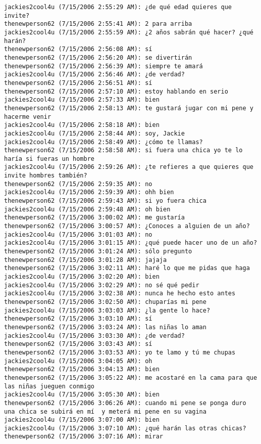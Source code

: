 \begin{verbatim}
jackies2cool4u (7/15/2006 2:55:29 AM): ¿de qué edad quieres que invite?
thenewperson62 (7/15/2006 2:55:41 AM): 2 para arriba
jackies2cool4u (7/15/2006 2:55:59 AM): ¿2 años sabrán qué hacer? ¿qué harán?
thenewperson62 (7/15/2006 2:56:08 AM): sí
thenewperson62 (7/15/2006 2:56:20 AM): se divertirán
thenewperson62 (7/15/2006 2:56:39 AM): siempre te amará
jackies2cool4u (7/15/2006 2:56:46 AM): ¿de verdad?
thenewperson62 (7/15/2006 2:56:51 AM): sí
thenewperson62 (7/15/2006 2:57:10 AM): estoy hablando en serio
jackies2cool4u (7/15/2006 2:57:33 AM): bien
thenewperson62 (7/15/2006 2:58:13 AM): te gustará jugar con mi pene y hacerme venir
jackies2cool4u (7/15/2006 2:58:18 AM): bien
jackies2cool4u (7/15/2006 2:58:44 AM): soy, Jackie
jackies2cool4u (7/15/2006 2:58:49 AM): ¿cómo te llamas?
thenewperson62 (7/15/2006 2:58:58 AM): si fuera una chica yo te lo haría si fueras un hombre
jackies2cool4u (7/15/2006 2:59:26 AM): ¿te refieres a que quieres que invite hombres también?
thenewperson62 (7/15/2006 2:59:35 AM): no
jackies2cool4u (7/15/2006 2:59:39 AM): ohh bien
thenewperson62 (7/15/2006 2:59:43 AM): si yo fuera chica
jackies2cool4u (7/15/2006 2:59:48 AM): oh bien
thenewperson62 (7/15/2006 3:00:02 AM): me gustaría
thenewperson62 (7/15/2006 3:00:57 AM): ¿Conoces a alguien de un año?
jackies2cool4u (7/15/2006 3:01:03 AM): no
jackies2cool4u (7/15/2006 3:01:15 AM): ¿qué puede hacer uno de un año?
thenewperson62 (7/15/2006 3:01:24 AM): sólo pregunto
thenewperson62 (7/15/2006 3:01:28 AM): jajaja
thenewperson62 (7/15/2006 3:02:11 AM): haré lo que me pidas que haga
jackies2cool4u (7/15/2006 3:02:20 AM): bien
jackies2cool4u (7/15/2006 3:02:29 AM): no sé qué pedir
jackies2cool4u (7/15/2006 3:02:38 AM): nunca he hecho esto antes
thenewperson62 (7/15/2006 3:02:50 AM): chuparías mi pene
jackies2cool4u (7/15/2006 3:03:03 AM): ¿la gente lo hace?
thenewperson62 (7/15/2006 3:03:10 AM): sí
thenewperson62 (7/15/2006 3:03:24 AM): las niñas lo aman
jackies2cool4u (7/15/2006 3:03:30 AM): ¿de verdad?
thenewperson62 (7/15/2006 3:03:43 AM): sí
thenewperson62 (7/15/2006 3:03:53 AM): yo te lamo y tú me chupas
jackies2cool4u (7/15/2006 3:04:05 AM): oh
thenewperson62 (7/15/2006 3:04:13 AM): bien
thenewperson62 (7/15/2006 3:05:22 AM): me acostaré en la cama para que las niñas jueguen conmigo
jackies2cool4u (7/15/2006 3:05:30 AM): bien
thenewperson62 (7/15/2006 3:06:26 AM): cuando mi pene se ponga duro una chica se subirá en mí  y meterá mi pene en su vagina
jackies2cool4u (7/15/2006 3:07:00 AM): bien
jackies2cool4u (7/15/2006 3:07:10 AM): ¿qué harán las otras chicas?
thenewperson62 (7/15/2006 3:07:16 AM): mirar

\end{verbatim}
